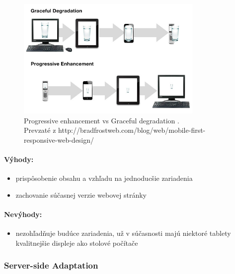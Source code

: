 \begin{figure}[H]
	\centering
	\includegraphics[width=0.8\textwidth]{img/PEvsGD.jpg}
	\caption[Progressive enhancement vs Graceful degradation]{
		Progressive enhancement vs Graceful degradation \cite{adaptivesxsw}.\\
		Prevzaté z http://bradfrostweb.com/blog/web/mobile-first-responsive-web-design/}
	\label{fig: gd}
\end{figure}

\paragraph{Výhody:}
\begin{itemize}
	\item prispôsobenie obsahu a vzhľadu na jednoducšie zariadenia
	\item zachovanie súčasnej verzie webovej stránky
\end{itemize}

\paragraph{Nevýhody:}
\begin{itemize}
	\item nezohľadňuje budúce zariadenia, už v súčasnosti majú niektoré tablety kvalitnejšie displeje ako stolové počítače 
\end{itemize}



\subsubsection{Server-side Adaptation} %
\label{ssub:ress_}

